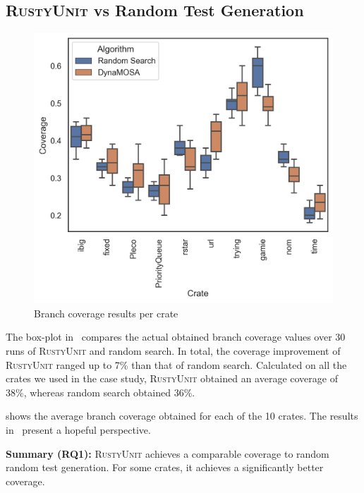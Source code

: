 \documentclass[paper=a4,%
  twoside,%
  BCOR4mm,%
  abstract=true,%
  toc=bibliography,%
  chapterprefix=true,%
  toc=bibliographynumbered,%
  open=right,%
  english,%
  pagesize=pdftex]{scrreprt}
\newcommand{\benchnum}{10\xspace}
\newcommand{\tech}{\textsc{RustyUnit}\xspace}
\newcommand{\runs}{30\xspace}
\begin{document}
\subsection{\tech vs Random Test Generation}
\begin{figure}[ht]
\caption{\label{fig:results-ru-rs-coverage}Branch coverage results per crate}
\centering
\includegraphics[width=\textwidth]{coverage}
\end{figure}

The box-plot in~ compares the actual obtained branch coverage values over \runs runs of \tech and random search. In total, the coverage improvement of \tech ranged up to 7\% than that of random search. Calculated on all the crates we used in the case study, \tech obtained an average coverage of 38\%, whereas random search obtained 36\%.

 shows the average branch coverage obtained for each of the \benchnum crates. The results in~ present a hopeful perspective. 

\begin{tcolorbox}
\textbf{Summary (RQ1):} \tech achieves a comparable coverage to random random test generation. For some crates, it achieves a significantly better coverage. 
\end{tcolorbox}
\end{document}
